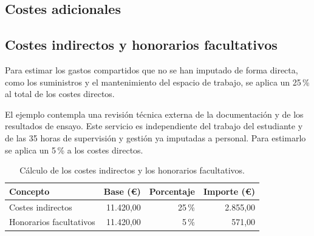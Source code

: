 \begin{samepage}
  \section{Costes adicionales}

  \subsection{Costes indirectos y honorarios facultativos}
  \label{sec:presupuesto-costes-adicionales}

  Para estimar los gastos compartidos que no se han imputado de forma
  directa, como los suministros y el mantenimiento del espacio de trabajo,
  se aplica un 25\,\% al total de los costes directos.

  El ejemplo contempla una revisión técnica externa de la documentación y
  de los resultados de ensayo. Este servicio es independiente del trabajo
  del estudiante y de las 35 horas de supervisión y gestión ya imputadas
  a personal. Para estimarlo se aplica un 5\,\% a los costes directos.

  \nopagebreak
  \begin{table}[H]
    \caption{Cálculo de los costes indirectos y los honorarios facultativos.}
    \label{tab:presupuesto-costes-adicionales}
    \begin{tabularx}{\linewidth}{@{}>{\raggedright\arraybackslash}X r r r@{}}
      \hline
      \textbf{Concepto}         & \textbf{Base (€)} & \textbf{Porcentaje} & \textbf{Importe (€)} \\
      \hline
      Costes indirectos        &         11.420,00 &              25\,\% &             2.855,00 \\
      Honorarios facultativos  &         11.420,00 &               5\,\% &               571,00 \\
      \hline
    \end{tabularx}
  \end{table}
\end{samepage}
\pagebreak[0]

